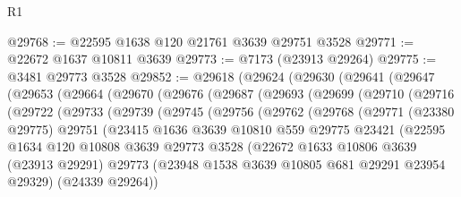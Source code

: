 \begin{lexlean}{R1}
\begin{coremodule}
@29768 := @22595 @1638 @120 @21761 @3639 @29751 @3528
@29771 := @22672 @1637 @10811 @3639
@29773 := @7173 (@23913 @29264)
@29775 := @3481 @29773 @3528
@29852 := @29618
    (@29624
      (@29630
        (@29641
          (@29647
            (@29653
              (@29664
                (@29670
                  (@29676
                    (@29687
                      (@29693
                        (@29699
                          (@29710
                            (@29716
                              (@29722
                                (@29733
                                  (@29739
                                    (@29745
                                      (@29756
                                        (@29762
                                          (@29768
                                            (@29771
                                              (@23380 @29775)
                                              @29751
                                              (@23415
                                                @1636
                                                @3639
                                                @10810
                                                @559
                                                @29775
                                                @23421
                                                (@22595
                                                  @1634
                                                  @120
                                                  @10808
                                                  @3639
                                                  @29773
                                                  @3528
                                                  (@22672
                                                    @1633
                                                    @10806
                                                    @3639
                                                    (@23913 @29291)
                                                    @29773
                                                    (@23948
                                                      @1538
                                                      @3639
                                                      @10805
                                                      @681
                                                      @29291
                                                      @23954
                                                      @29329)
                                                    (@24339 @29264))

\end{coremodule}
\end{lexlean}
